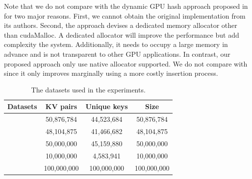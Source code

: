 Note that we do not compare with the dynamic GPU hash approach proposed in \cite{ashkiani2018dynamic} for two major reasons. First, we cannot obtain the original implementation from its authors. Second, the approach devises a dedicated memory allocator other than cudaMalloc. A dedicated allocator will improve the performance but add complexity the system. Additionally, it needs to occupy a large memory in advance and is not transparent to other GPU applications.
In contrast, our proposed approach only use native allocator supported. 
We do not compare with \cite{breslow2016horton} since it only improves \megakv marginally using a more costly insertion process.

\begin{table}[t]
	\caption{The datasets used in the experiments.}
	\label{table:exp_data_sets}
	\centering
	\begin{tabular}{|c|c|c|c|}
		\hline
		Datasets & KV pairs & Unique keys & Size \\ \hline
		\dstwitter &50,876,784 & 44,523,684&50,876,784\\ \hline
		\dsreddit & 48,104,875 & 41,466,682 & 48,104,875\\ \hline
		\dstpch &50,000,000 & 45,159,880&50,000,000 \\ \hline
		\dsali &10,000,000 & 4,583,941&10,000,000 \\ \hline
		\dsrandom & 100,000,000& 100,000,000&100,000,000 \\ \hline
	\end{tabular}
\end{table}

